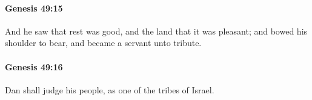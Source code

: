 		\paragraph{Genesis 49:15} %
			\label{GENESIS-49-15}

			And he saw that rest was good, and the land that it was pleasant; and bowed his shoulder to bear, and became a servant unto tribute.


		\paragraph{Genesis 49:16} %
			\label{GENESIS-49-16}

			Dan shall judge his people, as one of the tribes of Israel.


